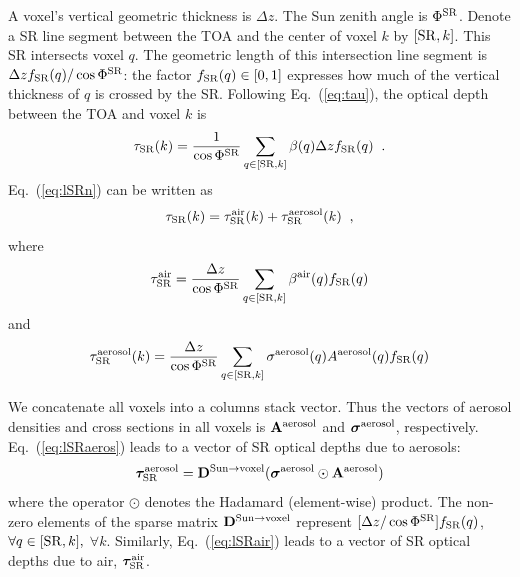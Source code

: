 \documentclass[10pt,twocolumn,letterpaper]{article}
\newcommand{\vect}[1]{\bm{#1}}
\begin{document}
A voxel's vertical geometric thickness is $\Delta z$.  The Sun zenith angle is $\Phi^{\rm SR}$. 
Denote a SR line segment between the TOA and the center of voxel $k$ by $[{\rm SR},k]$.  
This SR intersects voxel $q$. The geometric length of this intersection
line segment is $\Delta z f_{\rm SR}(q)/\cos\Phi^{\rm SR}$: the factor
$f_{\rm SR}(q)\in [0,1]$ expresses how much of the vertical thickness of $q$ is crossed by the SR.
Following Eq.~(\ref{eq:tau}), the optical depth between the TOA and voxel $k$ is
\begin{equation}
  \tau_{\rm SR}(k)=\frac{1}{\cos\Phi^{\rm SR}}
     \sum_{q \in[{\rm SR},k]}
     \beta(q)\Delta z  f_{\rm SR}(q)
  \;\;.
  \label{eq:lSRn}
\end{equation}
Eq.~(\ref{eq:lSRn}) can be written as 
\begin{equation}
  \tau_{\rm SR}(k)= 
   \tau_{\rm SR}^{\rm air}(k) +  \tau_{\rm SR}^{\rm aerosol}(k)
  \;\;,
  \label{eq:lSRaa}
\end{equation}
where
\begin{equation}
  \tau_{\rm SR}^{\rm air}=\frac{\Delta z}{\cos\Phi^{\rm SR}}
     \sum_{q \in[{\rm SR},k]}
     \beta^{\rm air}(q)  f_{\rm SR}(q)
  \label{eq:lSRair}
\end{equation}
and
\begin{equation}
  \tau_{\rm SR}^{\rm aerosol}(k)=\frac{\Delta z}{\cos\Phi^{\rm SR}}
     \sum_{q \in[{\rm SR},k]}
     \sigma^{\rm aerosol}(q) A^{\rm aerosol}(q) f_{\rm SR}(q)
  \label{eq:lSRaeros}
\end{equation}


We concatenate all voxels into a columns stack vector. Thus the vectors of 
aerosol densities and cross sections in all voxels is ${\bf A}^{\rm aerosol}$
and $\vect{\sigma}^{\rm aerosol}$, respectively. 
Eq.~(\ref{eq:lSRaeros}) leads to a vector of SR optical depths due to aerosols:
\begin{equation}
  \vect{\tau}_{\rm SR}^{\rm aerosol}=
  {\bf D}^{\mathrm{Sun \rightarrow voxel}}
     (\vect{\sigma}^{\rm aerosol} \odot {\bf A}^{\rm aerosol})
  \label{eq:tauSRvec1}
\end{equation}
where the operator $\odot$ denotes the Hadamard (element-wise)
product. The non-zero elements of the sparse matrix ${\bf D}^{\mathrm{Sun \rightarrow voxel}}$ 
represent $[\Delta z/\cos\Phi^{\rm SR}]f_{\rm SR}(q)$, \mbox{$\forall q \in[{\rm SR},k],$} $\forall k$.
Similarly, Eq.~(\ref{eq:lSRair}) leads to a vector of SR optical depths due to air, 
$\vect{\tau}_{\rm SR}^{\rm air}$. 
\end{document}

